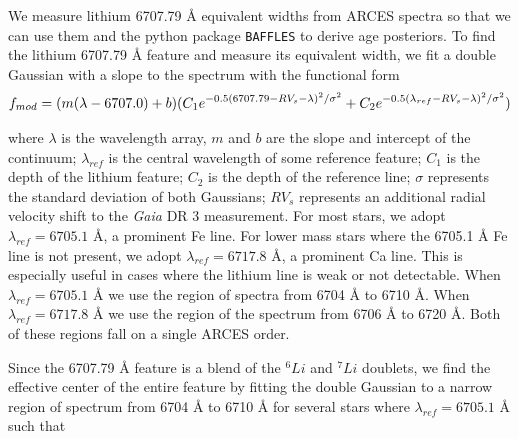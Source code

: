 We measure lithium 6707.79 \r{A} equivalent widths from ARCES spectra so that we can use them and the python package \texttt{BAFFLES} \citep{2020ApJ...898...27S} to derive age posteriors.  To find the lithium 6707.79 \r{A} feature and measure its equivalent width, we fit a double Gaussian with a slope to the spectrum with the functional form
\begin{equation}
  {\color{black} f_{mod} = (m(\lambda-6707.0)+b)(C_{1}e^{-0.5(6707.79 -RV_{s}-\lambda)^{2}/\sigma^{2}}+C_{2}e^{-0.5(\lambda_{ref}-RV_{s}-\lambda)^{2}/\sigma^{2}})}
\end{equation}

\noindent where $\lambda$ is the wavelength array, $m$ and $b$ are the slope and intercept of the continuum; $\lambda_{ref}$ is the central wavelength of some reference feature; $C_{1}$ is the depth of the lithium feature; $C_{2}$ is the depth of the reference line; $\sigma$ represents the standard deviation of both Gaussians; $RV_{s}$ represents an additional radial velocity shift to the \textit{Gaia} DR 3 measurement.  For most stars, we adopt $\lambda_{ref} = 6705.1$  \r{A}, a prominent Fe line. For lower mass stars where the 6705.1 \r{A} Fe line is not present, we adopt $\lambda_{ref} =  6717.8$  \r{A}, a prominent Ca line.  This is especially useful in cases where the lithium line is weak or not detectable. When $\lambda_{ref} = 6705.1$ \r{A} we use the region of spectra from 6704 \r{A} to 6710  \r{A}. When $\lambda_{ref} = 6717.8$ \r{A} we use the region of the spectrum from 6706 \r{A} to 6720  \r{A}. Both of these regions fall on a single ARCES order.

Since the 6707.79 \r{A} feature is a blend of the $^6Li$ and $^7Li$ doublets, we find the effective center of the entire feature by fitting the double Gaussian to a narrow region of spectrum from 6704 \r{A} to 6710 \r{A} for several stars where $\lambda_{ref} = 6705.1$ \r{A} such that

